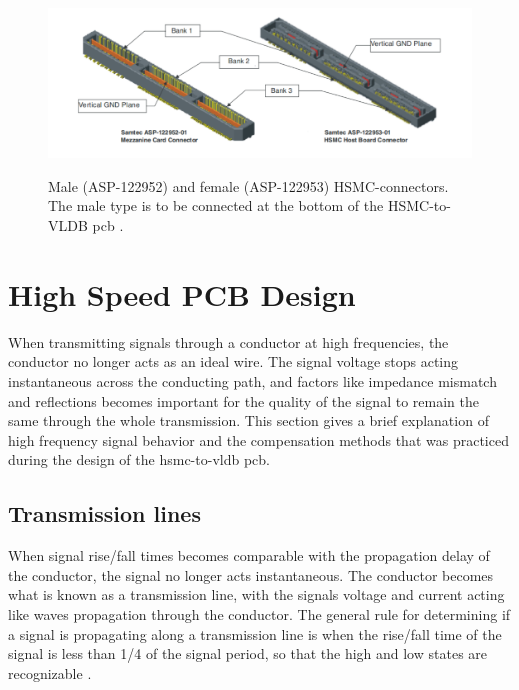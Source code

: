 \documentclass[main.tex]{subfiles}
\begin{document}
\begin{figure}[ht] %
\includegraphics[width=\linewidth]{../img/HSMC_52_53_hsmcspec}  \\[0.1 cm]
\caption{Male (ASP-122952) and female (ASP-122953) HSMC-connectors. The male type is to be connected at the bottom of the HSMC-to-VLDB \gls{pcb} \cite[Figure 2-1]{altera_hsmc09}.}
\label{fig:hsmc}
\end{figure}

\section{High Speed PCB Design}

When transmitting signals through a conductor at high frequencies, the conductor no longer acts as an ideal wire. The signal voltage stops acting instantaneous across the conducting path, and factors like impedance mismatch and reflections becomes important for the quality of the signal to remain the same through the whole transmission. This section gives a brief explanation of high frequency signal behavior and the compensation methods that was practiced during the design of the \gls{hsmc}-to-\gls{vldb} \gls{pcb}.


\subsection{Transmission lines}

When signal rise/fall times becomes comparable with the propagation delay of the conductor, the signal no longer acts instantaneous. The conductor becomes what is known as a transmission line, with the signals voltage and current acting like waves propagation through the conductor. 
The general rule for determining if a signal is propagating along a transmission line is when the rise/fall time of the signal is less than 1/4 of the signal period, so that the high and low states are recognizable \cite{weste11}.
\end{document}
